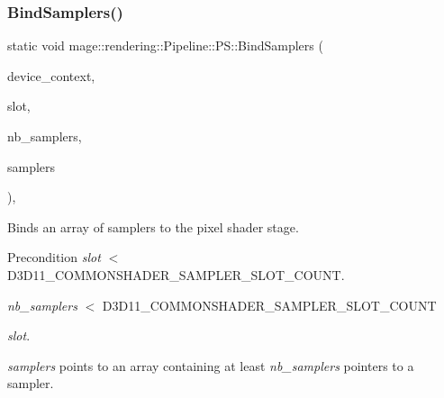 \subsubsection{\texorpdfstring{Bind\+Samplers()}{BindSamplers()}}
{\footnotesize\ttfamily static void mage\+::rendering\+::\+Pipeline\+::\+P\+S\+::\+Bind\+Samplers (\begin{DoxyParamCaption}\item[{I\+D3\+D11\+Device\+Context \&}]{device\+\_\+context,  }\item[{\mbox{\hyperlink{namespacemage_aa5d6eaabaac3cdd01873d6a3d27e90f3}{U32}}}]{slot,  }\item[{\mbox{\hyperlink{namespacemage_aa5d6eaabaac3cdd01873d6a3d27e90f3}{U32}}}]{nb\+\_\+samplers,  }\item[{I\+D3\+D11\+Sampler\+State $\ast$const $\ast$}]{samplers }\end{DoxyParamCaption})\hspace{0.3cm}{\ttfamily [static]}, {\ttfamily [noexcept]}}

Binds an array of samplers to the pixel shader stage.

\begin{DoxyPrecond}{Precondition}
{\itshape slot} $<$ {\ttfamily D3\+D11\+\_\+\+C\+O\+M\+M\+O\+N\+S\+H\+A\+D\+E\+R\+\_\+\+S\+A\+M\+P\+L\+E\+R\+\_\+\+S\+L\+O\+T\+\_\+\+C\+O\+U\+NT}. 

{\itshape nb\+\_\+samplers} $<$ {\ttfamily D3\+D11\+\_\+\+C\+O\+M\+M\+O\+N\+S\+H\+A\+D\+E\+R\+\_\+\+S\+A\+M\+P\+L\+E\+R\+\_\+\+S\+L\+O\+T\+\_\+\+C\+O\+U\+NT} 
\begin{DoxyItemize}
\item {\itshape slot}. 
\end{DoxyItemize}

{\itshape samplers} points to an array containing at least {\itshape nb\+\_\+samplers} pointers to a sampler. 
\end{DoxyPrecond}

